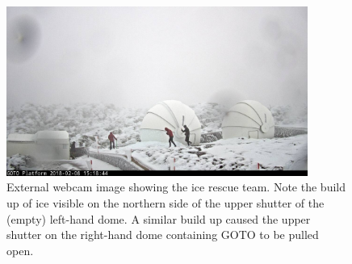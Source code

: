 \begin{colsection}
\begin{colsection}
\begin{figure}[p]
    \begin{center}
    \includegraphics[width=0.88\textwidth]{images/ice_outside.jpeg}
    \end{center}
    \caption[External webcam image showing the ice rescue team]{
        External webcam image showing the ice rescue team. Note the build up of ice visible on the northern side of the upper shutter of the (empty) left-hand dome. A similar build up caused the upper shutter on the right-hand dome containing GOTO to be pulled open.
    }\label{fig:ice_external}
\end{figure}

\clearpage

\end{colsection}


\end{colsection}

